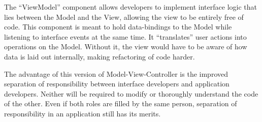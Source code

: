 \documentclass[thesis.tex]{subfiles}
\begin{document}
The ``ViewModel'' component allows developers to implement interface logic that
lies between the Model and the View, allowing the view to be entirely free
of code. This component is meant to hold data-bindings to the Model while
listening to interface events at the same time. It ``translates'' user actions
into operations on the Model. Without it, the view would have to be aware of how
data is laid out internally, making refactoring of code harder.

The advantage of this version of Model-View-Controller is the improved
separation of responsibility between interface developers and application
developers. Neither will be required to modify or thoroughly understand the code
of the other. Even if both roles are filled by the same person,
separation of responsibility in an application still has its merits.
\end{document}
